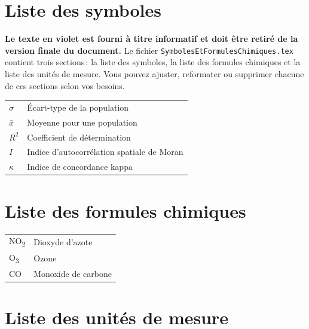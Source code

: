 
\chapter*{Liste des symboles}

\textcolor{eclipsepurple}{\textbf{Le texte en violet est fourni à titre informatif et doit être retiré de la version finale du document.} Le fichier \texttt{SymbolesEtFormulesChimiques.tex} contient trois sections\,: la liste des symboles, la liste des formules chimiques et la liste des unités de mesure. Vous pouvez ajuster, reformater ou supprimer chacune de ces sections selon vos besoins.}

\begin{tabularx}{\textwidth}{p{1.5cm} X}
    $\sigma$   & Écart-type de la population \\[4pt]
    $\bar{x}$  & Moyenne pour une population \\[4pt]
    $R^2$ & Coefficient de détermination \\[4pt]
    $I$         & Indice d'autocorrélation spatiale de Moran \\[4pt]
    $\kappa$    & Indice de concordance kappa \\
\end{tabularx}

\chapter*{Liste des formules chimiques}

\begin{tabularx}{\textwidth}{p{1.5cm} X}
    NO\textsubscript{2} & Dioxyde d’azote \\[4pt]
    O\textsubscript{3}  & Ozone \\[4pt]
    CO  & Monoxide de carbone \\[4pt]
\end{tabularx}

\chapter*{Liste des unités de mesure}


